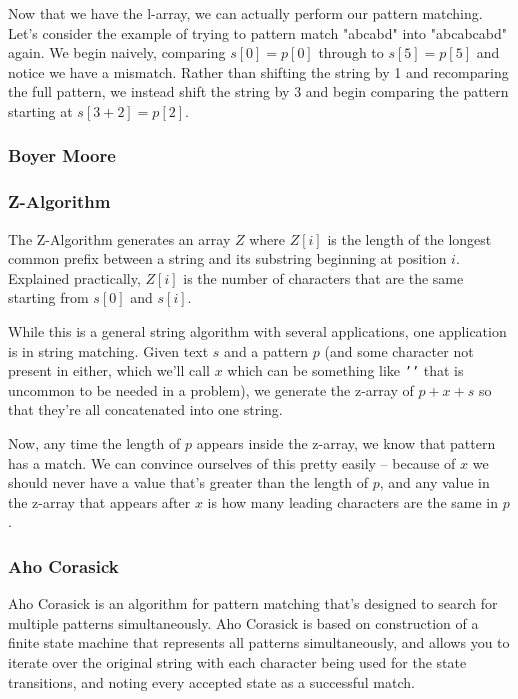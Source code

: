 Now that we have the l-array, we can actually perform our pattern matching. Let's consider the example of trying to pattern match "abcabd" into "abcabcabd" again. We begin naively, comparing $s[0] = p[0]$ through to $s[5] = p[5]$ and notice we have a mismatch. Rather than shifting the string by 1 and recomparing the full pattern, we instead shift the string by 3 and begin comparing the pattern starting at $s[3+2] = p[2]$.

\subsubsection{Boyer Moore}
\subsubsection{Z-Algorithm}

The Z-Algorithm generates an array $Z$ where $Z[i]$ is the length of the longest common prefix between a string and its substring beginning at position $i$. Explained practically, $Z[i]$ is the number of characters that are the same starting from $s[0]$ and $s[i]$.

While this is a general string algorithm with several applications, one application is in string matching. Given text $s$ and a pattern $p$ (and some character not present in either, which we'll call $x$ which can be something like \texttt{'\n'} that is uncommon to be needed in a problem), we generate the z-array of $p+x+s$ so that they're all concatenated into one string.

Now, any time the length of $p$ appears inside the z-array, we know that pattern has a match. We can convince ourselves of this pretty easily -- because of $x$ we should never have a value that's greater than the length of $p$, and any value in the z-array that appears after $x$ is how many leading characters are the same in $p$.

\subsubsection{Aho Corasick}

Aho Corasick is an algorithm for pattern matching that's designed to search for multiple patterns simultaneously. Aho Corasick is based on construction of a finite state machine that represents all patterns simultaneously, and allows you to iterate over the original string with each character being used for the state transitions, and noting every accepted state as a successful match.

